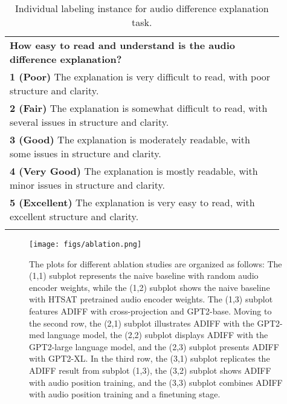 \begin{table}[ht!]
\begin{tabular}{p{0.9\linewidth}}
\textbf{How easy to read and understand is the audio difference explanation?}\\
\textbf{1 (Poor)} The explanation is very difficult to read, with poor structure and clarity.\\
\textbf{2 (Fair)} The explanation is somewhat difficult to read, with several issues in structure and clarity.\\
\textbf{3 (Good)} The explanation is moderately readable, with some issues in structure and clarity.\\
\textbf{4 (Very Good)} The explanation is mostly readable, with minor issues in structure and clarity.\\
\textbf{5 (Excellent)} The explanation is very easy to read, with excellent structure and clarity.
\\
\\

\bottomrule \bottomrule
\end{tabular}
\caption{\small Individual labeling instance for audio difference explanation task. \label{tab:questions}
}
\end{table}

\begin{figure*}[!ht]
   \centering
     \texttt{[image: figs/ablation.png]}
     \caption{\small The plots for different ablation studies are organized as follows: The (1,1) subplot represents the naive baseline with random audio encoder weights, while the (1,2) subplot shows the naive baseline with HTSAT pretrained audio encoder weights. The (1,3) subplot features ADIFF with cross-projection and GPT2-base. Moving to the second row, the (2,1) subplot illustrates ADIFF with the GPT2-med language model, the (2,2) subplot displays ADIFF with the GPT2-large language model, and the (2,3) subplot presents ADIFF with GPT2-XL. In the third row, the (3,1) subplot replicates the ADIFF result from subplot (1,3), the (3,2) subplot shows ADIFF with audio position training, and the (3,3) subplot combines ADIFF with audio position training and a finetuning stage.
     }
     \label{fig:subplots}
\end{figure*}

